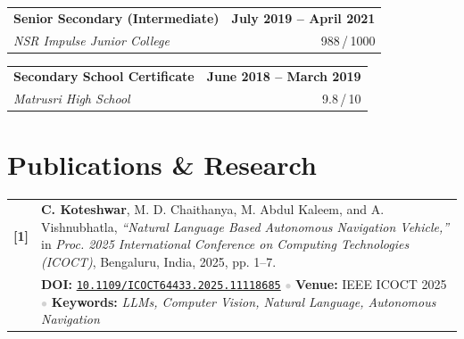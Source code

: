 \documentclass[a4paper,11pt]{article}
\begin{document}
\vspace{6pt}

\begin{tabularx}{\linewidth}{@{}X r@{}}
  \textbf{Senior Secondary (Intermediate)} & \textbf{July 2019 -- April 2021} \\
  \textit{\color{lightgray}NSR Impulse Junior College} & \small\color{lightgray}988\,/\,1000 \\
\end{tabularx}

\vspace{6pt}

\begin{tabularx}{\linewidth}{@{}X r@{}}
  \textbf{Secondary School Certificate} & \textbf{June 2018 -- March 2019} \\
  \textit{\color{lightgray}Matrusri High School} & \small\color{lightgray}9.8\,/\,10 \\
\end{tabularx}


\section{Publications \& Research}

\begin{tabularx}{\linewidth}{@{}l X@{}}
  \textcolor{accent}{\textbf{[1]}} &
  \textbf{C. Koteshwar}, M. D. Chaithanya, M. Abdul Kaleem, and A. Vishnubhatla,
  \textit{``Natural Language Based Autonomous Navigation Vehicle,''}
  in \textit{Proc. 2025 International Conference on Computing Technologies (ICOCT)},
  Bengaluru, India, 2025, pp. 1--7. \\[8pt] \vspace{8pt}

  & \small
    \textcolor{accent}{\textbf{DOI:}}
    \href{https://doi.org/10.1109/ICOCT64433.2025.11118685}{\texttt{10.1109/ICOCT64433.2025.11118685}}
    \quad\textcolor{lightgray}{$\bullet$}\quad
    \textcolor{accent}{\textbf{Venue:}} IEEE ICOCT 2025
    \quad\textcolor{lightgray}{$\bullet$}\quad
    \textcolor{accent}{\textbf{Keywords:}} \textit{LLMs, Computer Vision, Natural Language, Autonomous Navigation}
\end{tabularx}

\end{document}
